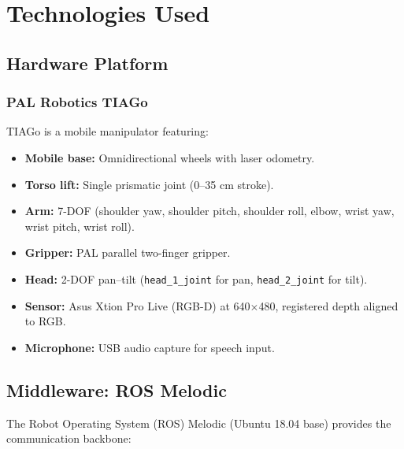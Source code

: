 \documentclass[12pt,a4paper]{report}
\begin{document}
\chapter{Technologies Used}

\section{Hardware Platform}

\subsection{PAL Robotics TIAGo}

TIAGo is a mobile manipulator featuring:

\begin{itemize}[noitemsep]
  \item \textbf{Mobile base:} Omnidirectional wheels with laser odometry.
  \item \textbf{Torso lift:} Single prismatic joint (0--35 cm stroke).
  \item \textbf{Arm:} 7-DOF (shoulder yaw, shoulder pitch, shoulder roll, elbow, wrist yaw, wrist pitch, wrist roll).
  \item \textbf{Gripper:} PAL parallel two-finger gripper.
  \item \textbf{Head:} 2-DOF pan--tilt (\texttt{head\_1\_joint} for pan, \texttt{head\_2\_joint} for tilt).
  \item \textbf{Sensor:} Asus Xtion Pro Live (RGB-D) at 640$\times$480, registered depth aligned to RGB.
  \item \textbf{Microphone:} USB audio capture for speech input.
\end{itemize}

\section{Middleware: ROS Melodic}

The Robot Operating System (ROS) Melodic (Ubuntu 18.04 base) provides the communication
backbone:
\end{document}
